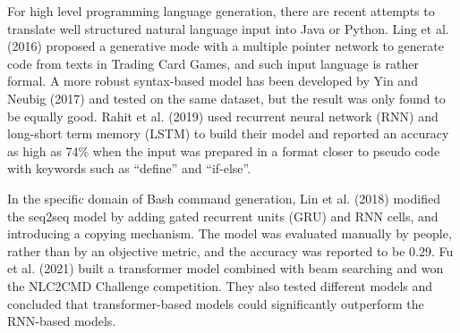 For high level programming language generation, there are recent attempts to
translate well structured natural language input into Java or Python.  Ling et
al. (2016) \cite{ling2016latent} proposed a generative mode with a multiple
pointer network to generate code from texts in Trading Card Games, and such
input language is rather formal. A more robust syntax-based model has been
developed by Yin and Neubig (2017) \cite{yin2017syntactic} and tested on the
same dataset, but the result was only found to be equally good. Rahit et al.
(2019) \cite{rahit2019machine} used recurrent neural network (RNN) and
long-short term memory (LSTM) to build their model and reported an accuracy as
high as 74\% when the input was prepared in a format closer to pseudo code with
keywords such as “define” and “if-else”.

In the specific domain of Bash command generation, Lin et al. (2018)
\cite{lin2018nl2bash} modified the seq2seq model by adding gated recurrent
units (GRU) and RNN cells, and introducing a copying mechanism. The model was
evaluated manually by people, rather than by an objective metric, and the accuracy was reported to be 0.29. Fu et al. (2021) \cite{Fu2021ATransform} built a transformer model combined with beam searching and won the NLC2CMD Challenge competition. They also tested different models and concluded that transformer-based models could significantly outperform the RNN-based models.
